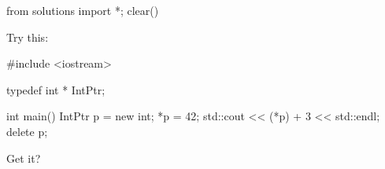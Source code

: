 \begin{python0}
from solutions import *; clear()
\end{python0}

Try this:

\begin{consolethree}[escapeinside=||]
#include <iostream>

typedef int * IntPtr;

int main()
{
    IntPtr p = new int;
    *p = 42;
    std::cout << (*p) + 3 << std::endl;
    delete p;
}
\end{consolethree}

Get it?





